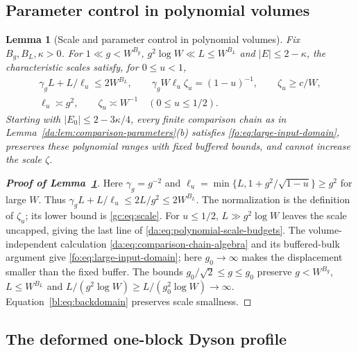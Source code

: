 \documentclass[11pt]{article}
\numberwithin{equation}{section}
\newtheorem{lemma}[theorem]{Lemma}
\theoremstyle{remark}
\begin{document}
\subsection{Parameter control in polynomial volumes}\label{app:polynomial-iteration}
\begin{lemma}[Scale and parameter control in polynomial volumes]
\label{da:lem:polynomial-parameters}
Fix $B_g,B_L,\kappa>0$. For
$1\ll g<W^{B_g}$, $g^2\log W\ll L\le W^{B_L}$ and
$|E|\le2-\kappa$, the characteristic scales satisfy, for $0\le u<1$,
\begin{equation}\label{da:eq:polynomial-scale-budgets}
 \begin{gathered}
 \gamma_gL+L/\ell_u\le2W^{B_L},\qquad
 \gamma_gW\ell_u\zeta_u=(1-u)^{-1},\qquad \zeta_u\ge c/W,\\
 \ell_u\asymp g^2,\qquad\zeta_u\asymp W^{-1}
       \quad(0\le u\le1/2).
 \end{gathered}
\end{equation}
Starting with $|E_0|\le2-3\kappa/4$, every finite comparison chain
as in Lemma~\ref{da:lem:comparison-parameters}(b) satisfies
\eqref{fo:eq:large-input-domain}, preserves these polynomial ranges
with fixed buffered bounds, and cannot increase the scale $\zeta$.
\end{lemma}
\begin{proof}[\textbf{Proof of Lemma~\ref{da:lem:polynomial-parameters}}]
Here $\gamma_g=g^{-2}$ and
$\ell_u=\min\{L,1+g^2/\sqrt{1-u}\}\ge g^2$ for large $W$.
Thus $\gamma_gL+L/\ell_u\le2L/g^2\le2W^{B_L}$.
The normalization is the definition of $\zeta_u$; its lower bound
is \eqref{gc:eq:scale}. For $u\le1/2$, $L\gg g^2\log W$ leaves
the scale uncapped, giving the last line of
\eqref{da:eq:polynomial-scale-budgets}.
The volume-independent calculation \eqref{da:eq:comparison-chain-algebra}
and its buffered-bulk argument give \eqref{fo:eq:large-input-domain};
here $g_0\to\infty$ makes the displacement smaller than the fixed buffer.
The bounds $g_0/\sqrt2\le g\le g_0$ preserve
$g<W^{B_g}$, $L\le W^{B_L}$ and
$L/(g^2\log W)\ge L/(g_0^2\log W)\to\infty$.
Equation~\eqref{bl:eq:backdomain} preserves scale smallness.
\end{proof}

\subsection{The deformed one-block Dyson profile}
\label{app:deformed-dyson}
\end{document}
